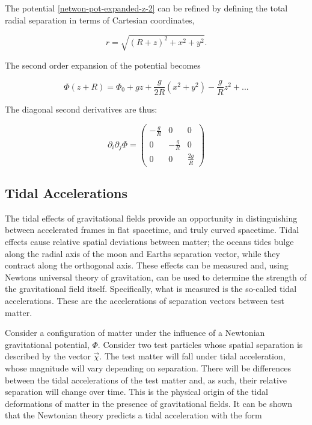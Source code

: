 \documentclass[11pt]{article}
\begin{document}
The potential \eqref{netwon-pot-expanded-z-2} can be refined by defining the total radial separation in terms of Cartesian coordinates,

\begin{equation}
    r = \sqrt{(R + z)^2 + x^2 + y^2}.
\end{equation}

The second order expansion of the potential becomes

\begin{equation}
    \Phi(z + R) = \Phi_0 + gz + \frac{g}{2R}(x^2 + y^2) - \frac{g}{R}z^2 + ...
\end{equation}

The diagonal second derivatives are thus:

\begin{equation}
    \label{tidal-acc-hessian}
    \partial_i \partial_j \Phi = 
    \begin{pmatrix}
        -\frac{g}{R} & 0  & 0\\
        0 & -\frac{g}{R} & 0\\
        0 & 0 & \frac{2g}{R}
    \end{pmatrix}
\end{equation}

\subsection{Tidal Accelerations}

The tidal effects of gravitational fields provide an opportunity in distinguishing between accelerated frames in flat spacetime, and truly curved spacetime. Tidal effects cause relative spatial deviations between matter; the oceans tides bulge along the radial axis of the moon and Earths separation vector, while they contract along the orthogonal axis. These effects can be measured and, using Newtons universal theory of gravitation, can be used to determine the strength of the gravitational field itself. Specifically, what is measured is the so-called tidal accelerations. These are the accelerations of separation vectors between test matter. 

Consider a configuration of matter under the influence of a Newtonian gravitational potential, $\Phi$. Consider two test particles whose spatial separation is described by the vector $\vec{\chi}$. The test matter will fall under tidal acceleration, whose magnitude will vary depending on separation. There will be differences between the tidal accelerations of the test matter and, as such, their relative separation will change over time. This is the physical origin of the tidal deformations of matter in the presence of gravitational fields. It can be shown that the Newtonian theory predicts a tidal acceleration with the form
\end{document}
